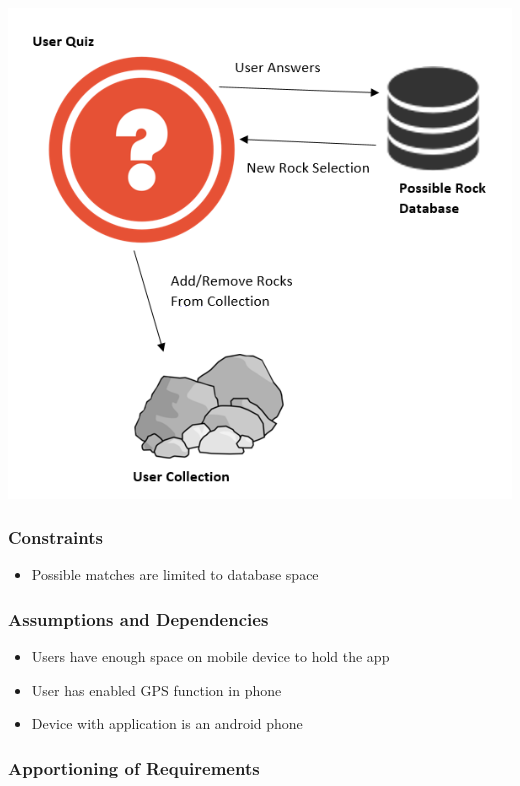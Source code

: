 \documentclass[titlepage]{article}
\begin{document}
\includegraphics{../resources/Interaction.png}

\subsubsection{Constraints}

\begin{itemize}
\item Possible matches are limited to database space\\
\end{itemize}


\subsubsection{Assumptions and Dependencies}

\begin{itemize}
\item Users have enough space on mobile device to hold the app\\
\item User has enabled GPS function in phone\\
\item Device with application is an android phone\\
\end{itemize}


\subsubsection{Apportioning of Requirements}
\end{document}

